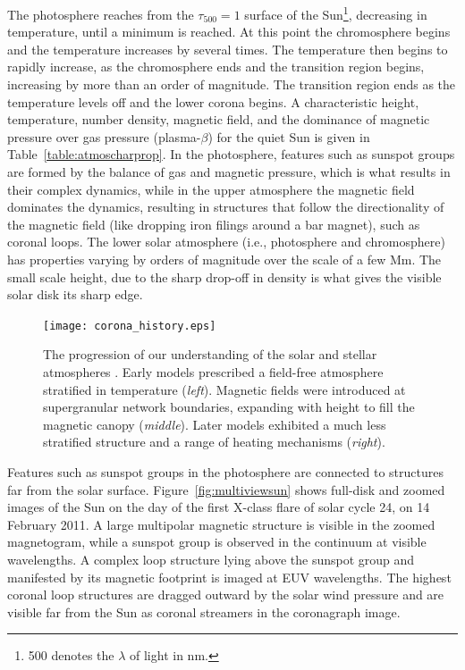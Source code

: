The photosphere reaches from the $\tau_{500}=1$ surface of the Sun\footnote{500 denotes the $\lambda$ of light in nm.}, decreasing in temperature, until a minimum is reached. At this point the chromosphere begins and the temperature increases by several times. The temperature then begins to rapidly increase, as the chromosphere ends and the transition region begins, increasing by more than an order of magnitude. The transition region ends as the temperature levels off and the lower corona begins. A characteristic height, temperature, number density, magnetic field, and the dominance of magnetic pressure over gas pressure (plasma-$\beta$) for the quiet Sun is given in Table~\ref{table:atmoscharprop}. In the photosphere, features such as sunspot groups are formed by the balance of gas and magnetic pressure, which is what results in their complex dynamics, while in the upper atmosphere the magnetic field dominates the dynamics, resulting in structures that follow the directionality of the magnetic field (like dropping iron filings around a bar magnet), such as coronal loops. The lower solar atmosphere (i.e., photosphere and chromosphere) has properties varying by orders of magnitude over the scale of a few Mm. The small scale height, due to the sharp drop-off in density is what gives the visible solar disk its sharp edge.

\begin{figure}[!t]
\centerline{\texttt{[image: corona\_history.eps]}}
\caption[The progression of our understanding of the solar and stellar atmospheres.]{The progression of our understanding of the solar and stellar atmospheres \citep[from][]{Schrijver:2001b}. Early models prescribed a field-free atmosphere stratified in temperature (\emph{left}). Magnetic fields were introduced at supergranular network boundaries, expanding with height to fill the magnetic canopy (\emph{middle}). Later models exhibited a much less stratified structure and a range of heating mechanisms (\emph{right}).}
\label{fig:coronahistory}
\end{figure}

Features such as sunspot groups in the photosphere are connected to structures far from the solar surface. Figure~\ref{fig:multiviewsun} shows full-disk and zoomed images of the Sun on the day of the first X-class flare of solar cycle 24, on 14 February 2011. A large multipolar magnetic structure is visible in the zoomed magnetogram, while a sunspot group is observed in the continuum at visible wavelengths. A complex loop structure lying above the sunspot group and manifested by its magnetic footprint is imaged at \gls{EUV} wavelengths. The highest coronal loop structures are dragged outward by the solar wind pressure and are visible far from the Sun as coronal streamers in the coronagraph image. 

